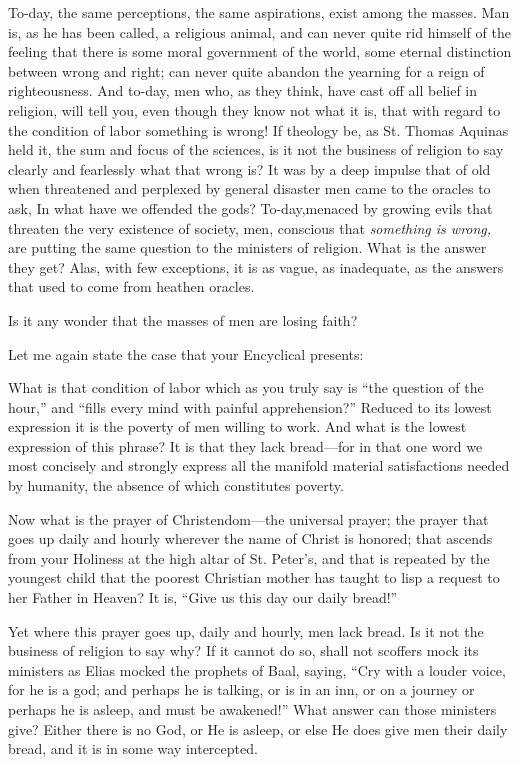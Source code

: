 \documentclass{book}
\begin{document}
To-day, the same perceptions, the same aspirations, exist among the masses. Man is, as he has been called, a religious animal, and can never quite rid himself of the feeling that there is some moral government of the world, some eternal distinction between wrong and right; can never quite abandon the yearning for a reign of righteousness. And to-day, men who, as they think, have cast off all belief in religion, will tell you, even though they know not what it is, that with regard to the condition of labor something is wrong! If theology be, as St. Thomas Aquinas held it, the sum and focus of the sciences, is it not the business of religion to say clearly and fearlessly what that wrong is? It was by a deep impulse that of old when threatened and perplexed by general disaster men came to the oracles to ask, In what have we offended the gods? To-day,menaced by growing evils that threaten the very existence of society, men, conscious that \emph{something is wrong,} are putting the same question to the ministers of religion. What is the answer they get? Alas, with few exceptions, it is as vague, as inadequate, as the answers that used to come from heathen oracles.

Is it any wonder that the masses of men are losing faith?

Let me again state the case that your Encyclical presents:

What is that condition of labor which as you truly say is “the question of the hour,” and “fills every mind with painful apprehension?” Reduced to its lowest expression it is the poverty of men willing to work. And what is the lowest expression of this phrase? It is that they lack bread—for in that one word we most concisely and strongly express all the manifold material satisfactions needed by humanity, the absence of which constitutes poverty.

Now what is the prayer of Christendom—the universal prayer; the prayer that goes up daily and hourly wherever the name of Christ is honored; that ascends from your Holiness at the high altar of St. Peter’s, and that is repeated by the youngest child that the poorest Christian mother has taught to lisp a request to her Father in Heaven? It is, “Give us this day our daily bread!”

Yet where this prayer goes up, daily and hourly, men lack bread. Is it not the business of religion to say why? If it cannot do so, shall not scoffers mock its ministers as Elias mocked the prophets of Baal, saying, “Cry with a louder voice, for he is a god; and perhaps he is talking, or is in an inn, or on a journey or perhaps he is asleep, and must be awakened!” What answer can those ministers give? Either there is no God, or He is asleep, or else He does give men their daily bread, and it is in some way intercepted.
\end{document}
